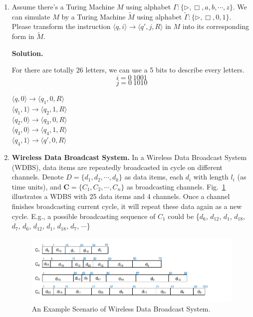 \documentclass[12pt,a4paper]{article}
\theoremstyle{definition}
\begin{document}
\begin{enumerate}
\item Assume there's a Turing Machine $M$ using alphabet $\Gamma :\{ \triangleright, \Box, a, b, \cdots, z\}$. We can simulate $M$ by a Turing Machine $\tilde{M}$ using alphabet $\tilde{\Gamma }:\{ \triangleright, \Box, 0, 1\}$. Please transform the instruction $\langle q, i \rangle \rightarrow \langle q',j, R\rangle$ in $M$ into its corresponding form in $\tilde{M}$.

\textbf{Solution.}

For there are totally 26 letters, we can use a 5 bits to describe every letters.
$$i=0\ 1001$$
$$j=0\ 1010$$

$\langle q, 0 \rangle \rightarrow \langle q_1, 0,  R\rangle$\\
$\langle q_1, 1 \rangle \rightarrow \langle q_2, 1,  R\rangle$\\
$\langle q_2, 0 \rangle \rightarrow \langle q_3, 0,  R\rangle$\\
$\langle q_3, 0 \rangle \rightarrow \langle q_4, 1,  R\rangle$\\
$\langle q_4, 1 \rangle \rightarrow \langle q', 0,  R\rangle$\\

\item \textbf{Wireless Data Broadcast System.}
In a Wireless Data Broadcast System (WDBS), data items are repeatedly broadcasted in cycle on different channels. Denote $D = \{d_1, d_2,\cdots, d_k\}$ as data items, each $d_i$ with length $l_i$ (as time units), and $\mathbf{C}=\{C_1, C_2, \cdots, C_n\}$ as broadcasting channels. Fig.~\ref{Fig-Broadcast} illustrates a WDBS with 25 data items and 4 channels. Once a channel finishes broadcasting current cycle, it will repeat these data again as a new cycle. E.g., a possible broadcasting sequence of $C_1$ could be \{$d_6$, $d_{12}$, $d_1$, $d_{18}$, $d_7$, $d_6$, $d_{12}$, $d_1$, $d_{18}$, $d_7$, $\cdots$\}

\begin{figure}[h]
	\centering
	\includegraphics[scale=1]{Fig-Broadcast.pdf}
	\caption{An Example Scenario of Wireless Data Broadcast System.} \label{Fig-Broadcast}
\end{figure}


\end{enumerate}
\end{document}
